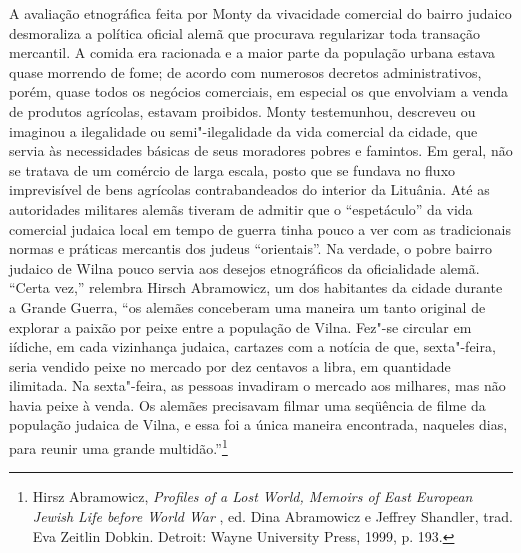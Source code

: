 A avaliação etnográfica feita por Monty da vivacidade comercial do
bairro judaico desmoraliza a política oficial alemã que procurava
regularizar toda transação mercantil. A comida era racionada e a maior
parte da população urbana estava quase morrendo de fome; de acordo com
numerosos decretos administrativos, porém, quase todos os negócios
comerciais, em especial os que envolviam a venda de produtos agrícolas,
estavam proibidos. Monty testemunhou, descreveu ou imaginou a
ilegalidade ou semi"-ilegalidade da vida comercial da cidade, que servia
às necessidades básicas de seus moradores pobres e famintos. Em geral,
não se tratava de um comércio de larga escala, posto que se fundava no
fluxo imprevisível de bens agrícolas contrabandeados do interior da
Lituânia. Até as autoridades militares alemãs tiveram de admitir que o
``espetáculo'' da vida comercial judaica local em tempo de guerra tinha
pouco a ver com as tradicionais normas e práticas mercantis dos judeus
``orientais''. Na verdade, o pobre bairro judaico de Wilna pouco servia
aos desejos etnográficos da oficialidade alemã. ``Certa vez,'' relembra
Hirsch Abramowicz, um dos habitantes da cidade durante a Grande Guerra,
``os alemães conceberam uma maneira um tanto original de explorar a
paixão por peixe entre a população de Vilna. Fez"-se circular em iídiche,
em cada vizinhança judaica, cartazes com a notícia de que, sexta"-feira,
seria vendido peixe no mercado por dez centavos a libra, em quantidade
ilimitada. Na sexta"-feira, as pessoas invadiram o mercado aos milhares,
mas não havia peixe à venda. Os alemães precisavam filmar uma seqüência
de filme da população judaica de Vilna, e essa foi a única maneira
encontrada, naqueles dias, para reunir uma grande multidão.''\footnote{Hirsz
  Abramowicz, \emph{Profiles of a Lost World, Memoirs of East European
  Jewish Life before World War }, ed. Dina Abramowicz e Jeffrey
  Shandler, trad. Eva Zeitlin Dobkin. Detroit: Wayne University Press,
  1999, p. 193.}

